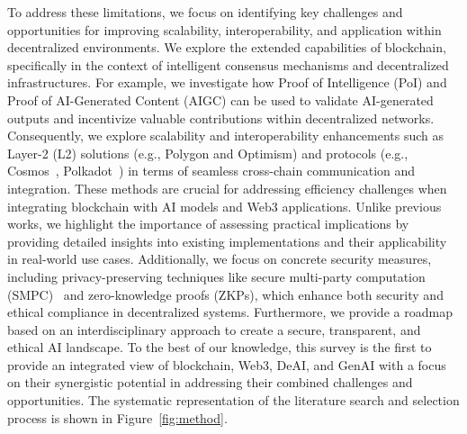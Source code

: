 \documentclass[5p,twocolumn]{elsarticle}
\begin{document}
To address these limitations, we focus on identifying key challenges and opportunities for improving scalability, interoperability, and application within decentralized environments. We explore the extended capabilities of blockchain, specifically in the context of intelligent consensus mechanisms and decentralized infrastructures. For example, we investigate how Proof of Intelligence (PoI) and Proof of AI-Generated Content (AIGC) can be used to validate AI-generated outputs and incentivize valuable contributions within decentralized networks. Consequently, we explore scalability and interoperability enhancements such as Layer-2 (L2) solutions (e.g., Polygon and Optimism) and protocols (e.g., Cosmos~\cite{kwon2019cosmos}, Polkadot~\cite{wood2016polkadot}) in terms of seamless cross-chain communication and integration. These methods are crucial for addressing efficiency challenges when integrating blockchain with AI models and Web3 applications. Unlike previous works, we highlight the importance of assessing practical implications by providing detailed insights into existing implementations and their applicability in real-world use cases. Additionally, we focus on concrete security measures, including privacy-preserving techniques like secure multi-party computation (SMPC)~\cite{du2001secure} and zero-knowledge proofs (ZKPs), which enhance both security and ethical compliance in decentralized systems. Furthermore, we provide a roadmap based on an interdisciplinary approach to create a secure, transparent, and ethical AI landscape. To the best of our knowledge, this survey is the first to provide an integrated view of blockchain, Web3, DeAI, and GenAI with a focus on their synergistic potential in addressing their combined challenges and opportunities. The systematic representation of the literature search and selection process is shown in Figure~\ref{fig:method}.
\end{document}

